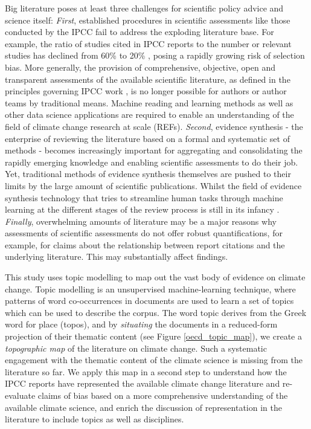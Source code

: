 \documentclass{article}
\begin{document}
\begin{linenumbers}
		Big literature poses at least three challenges for scientific policy advice and science itself: \emph{First}, established procedures in scientific assessments like those conducted by the IPCC fail to address the exploding literature base. For example, the ratio of studies cited in IPCC reports to the number or relevant studies has declined from 60\% to 20\%  \cite{Minx2017l}, posing a rapidly growing risk of selection bias. More generally, the provision of comprehensive, objective, open and transparent assessments of the available scientific literature, as defined in the principles governing IPCC work \cite{IPCC2013}, is no longer possible for authors or author teams by traditional means. Machine reading and learning methods as well as other data science applications are required to enable an understanding of the field of climate change research at scale (REFs). \emph{Second}, evidence synthesis - the enterprise of reviewing the literature based on a formal and systematic set of methods \cite{Chalmers2002} - becomes increasingly important for aggregating and consolidating the rapidly emerging knowledge and enabling scientific assessments to do their job. Yet, traditional methods of evidence synthesis themselves are pushed to their limits by the large amount of scientific publications. Whilst the field of evidence synthesis technology that tries to streamline human tasks through machine learning at the different stages of the review process is still in its infancy \cite{Beller2018}. \emph{Finally}, overwhelming amounts of literature may be a major reasons why assessments of scientific assessments \cite{Bjurström2011, Hulme2010, Victor2015, Corbera2016} do not offer robust quantifications, for example, for claims about the relationship between report citations and the underlying literature. This may substantially affect findings.
		
		This study uses topic modelling \cite{Blei2010} to map out the vast body of evidence on climate change. Topic modelling is an unsupervised machine-learning technique, where patterns of word co-occurrences in documents are used to learn a set of topics which can be used to describe the corpus. The word topic derives from the Greek word for place (topos), and by \textit{situating} the documents in a reduced-form projection of their thematic content (see Figure \ref{oecd_topic_map}), we create a \textit{topographic map} of the literature on climate change. Such a systematic engagement with the thematic content of the climate science is missing from the literature so far.%
		We apply this map in a second step to understand how the IPCC reports have represented the available climate change literature and re-evaluate claims of bias based on a more comprehensive understanding of the available climate science, and enrich the discussion of representation in the literature to include topics as well as disciplines. 
		

\end{linenumbers}
\end{document}
